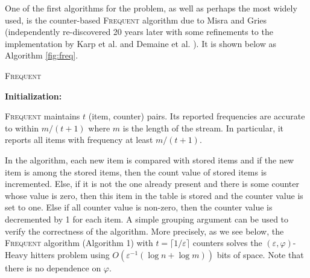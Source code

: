 \documentclass{article}
\newcommand{\eps}{\varepsilon}
\renewcommand{\phi}{\varphi}
\begin{document}
\begin{multicols}{2}
    One of the first algorithms for the problem, as well as perhaps the most widely used, is the counter-based \textsc{Frequent} algorithm  due to Misra and Gries \cite{MG82} (independently re-discovered 20 years later with some refinements to the implementation by Karp et al. \cite{KPS03} and Demaine et al. \cite{DLM02}). It is shown below as Algorithm \ref{fig:freq}.
    
    \begin{algorithm}[H]
    	\caption{\textsc{Frequent}}
	\label{fig:freq}
    	\SetAlgoLined
	

	\textbf{Initialization:}

    \end{algorithm}

    \vspace*{.5cm}
 \textsc{Frequent} maintains $t$ (item, counter) pairs. Its reported frequencies are accurate to within $m/(t+1)$ where $m$ is the length of the stream. In particular, it reports all items with frequency at least $m/(t+1)$. 

In the algorithm, each new item is compared with stored items and if the new item is among the stored items, then the count value of stored items is incremented. Else, if it is not the one already present and there is some counter whose value is zero, then this item in the table is stored and the counter value is set to one. Else if all counter value is non-zero, then the counter value is decremented by 1 for each item. A simple grouping argument can be used to verify the correctness of the algorithm. More precisely, as we see below, the \textsc{Frequent} algorithm (Algorithm 1) with $t = \lceil 1/\eps \rceil$ counters solves the $(\eps,\phi)$-Heavy hitters problem using $O(\varepsilon^{-1} (\log n + \log m))$ bits of space. Note that there is no dependence on $\phi$.


\end{multicols}
\end{document}
